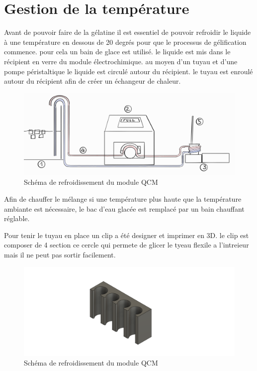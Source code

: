 \section{Gestion de la température}
Avant de pouvoir faire de la gélatine il est essentiel de pouvoir refroidir le liquide à une température en dessous de 20 degrés pour que le processus de gélification commence.
pour cela un bain de glace est utilisé. le liquide est mis dans le récipient en verre du module électrochimique. au moyen d'un tuyau et d'une pompe péristaltique le liquide est circulé autour du récipient. le tuyau est enroulé autour du récipient afin de créer un échangeur de chaleur.
\begin{figure}[H]
    \centering
    \includegraphics[width=\textwidth]{assets/figures/Pump TB.png}
    \caption{Schéma de refroidissement du module QCM}
    \label{fig:Shema_glacière}
\end{figure}
Afin de chauffer le mélange si une température plus haute que la température ambiante est nécessaire, le bac d'eau glacée est remplacé par un bain chauffant réglable.

Pour tenir le tuyau en place un clip a été designer et imprimer en 3D. le clip est composer de 4 section ce cercle qui permete de glicer le tyeau flexile a l'intreieur mais il ne peut pas sortir facilement.
\begin{figure}[H]
    \centering
    \includegraphics[width=\textwidth]{assets/figures/ATACHE TUBE V2.png}
    \caption{Schéma de refroidissement du module QCM}
    \label{fig:Shema_glacière}
\end{figure}

